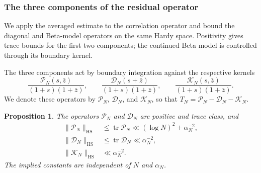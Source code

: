 \documentclass[12pt,a4paper]{amsart}
\numberwithin{equation}{section}
\def\le{\leqslant}
\theoremstyle{plain}
\newtheorem{proposition}{Proposition}[section]
\theoremstyle{definition}
\theoremstyle{remark}
\begin{document}
\subsubsection{The three components of the residual operator}

We apply the averaged estimate to the correlation operator and
bound the diagonal and Beta-model operators on the same Hardy space.
Positivity gives trace bounds for the first two components; the
continued Beta model is controlled through its boundary kernel.

The three components act by boundary integration against the
respective kernels
\[
 \frac{\mathscr P_N(s,\bar z)}{(1+s)(1+\bar z)},\qquad
 \frac{\mathscr D_N(s+\bar z)}{(1+s)(1+\bar z)},\qquad
 \frac{\mathscr K_N(s,\bar z)}{(1+s)(1+\bar z)}.
\]
We denote these operators by $\mathcal P_N$, $\mathcal D_N$, and
$\mathcal K_N$, so that
$T_N=\mathcal P_N-\mathcal D_N-\mathcal K_N$.
\begin{proposition}\label{proof:grh:component-bounds}
The operators $\mathcal P_N$ and $\mathcal D_N$ are positive
and trace class, and
\begin{align*}
 \|\mathcal P_N\|_{\mathrm{HS}}
       &\le\operatorname{tr}\mathcal P_N\ll (\log N)^2+\alpha_N^{-2},\\
 \|\mathcal D_N\|_{\mathrm{HS}}
       &\le\operatorname{tr}\mathcal D_N\ll\alpha_N^{-2},\\
 \|\mathcal K_N\|_{\mathrm{HS}}&\ll\alpha_N^{-2}.
\end{align*}
The implied constants are independent of $N$ and $\alpha_N$.
\end{proposition}
\end{document}
